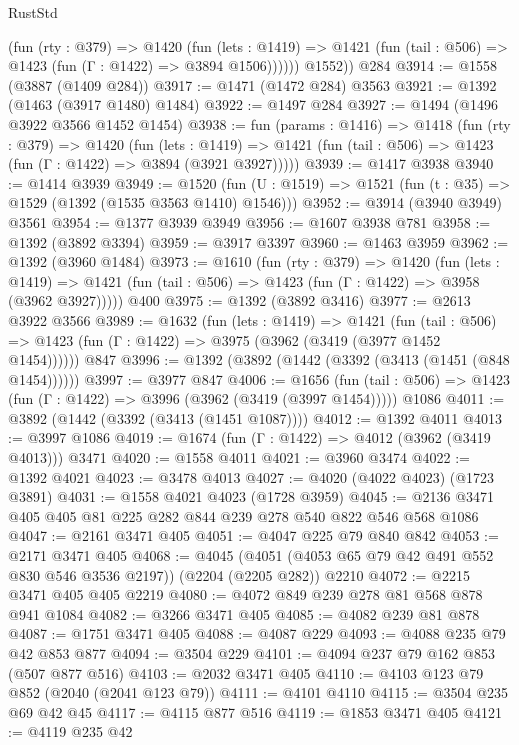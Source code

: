 \begin{lexlean}{RustStd}
\begin{coremodule}
            (fun (rty : @379) =>
            @1420
              (fun (lets : @1419) =>
              @1421 (fun (tail : @506) => @1423 (fun (Γ : @1422) => @3894 @1506))))))
        @1552))
    @284
@3914 := @1558 (@3887 (@1409 @284))
@3917 := @1471 (@1472 @284) @3563
@3921 := @1392 (@1463 (@3917 @1480) @1484)
@3922 := @1497 @284
@3927 := @1494 (@1496 @3922 @3566 @1452 @1454)
@3938 := fun (params : @1416) =>
  @1418
    (fun (rty : @379) =>
    @1420
      (fun (lets : @1419) =>
      @1421 (fun (tail : @506) => @1423 (fun (Γ : @1422) => @3894 (@3921 @3927)))))
@3939 := @1417 @3938
@3940 := @1414 @3939
@3949 := @1520 (fun (U : @1519) => @1521 (fun (t : @35) => @1529 (@1392 (@1535 @3563 @1410) @1546)))
@3952 := @3914 (@3940 @3949) @3561
@3954 := @1377 @3939 @3949
@3956 := @1607 @3938 @781
@3958 := @1392 (@3892 @3394)
@3959 := @3917 @3397
@3960 := @1463 @3959
@3962 := @1392 (@3960 @1484)
@3973 := @1610
    (fun (rty : @379) =>
    @1420
      (fun (lets : @1419) =>
      @1421 (fun (tail : @506) => @1423 (fun (Γ : @1422) => @3958 (@3962 @3927)))))
    @400
@3975 := @1392 (@3892 @3416)
@3977 := @2613 @3922 @3566
@3989 := @1632
    (fun (lets : @1419) =>
    @1421
      (fun (tail : @506) => @1423 (fun (Γ : @1422) => @3975 (@3962 (@3419 (@3977 @1452 @1454))))))
    @847
@3996 := @1392 (@3892 (@1442 (@3392 (@3413 (@1451 (@848 @1454))))))
@3997 := @3977 @847
@4006 := @1656
    (fun (tail : @506) => @1423 (fun (Γ : @1422) => @3996 (@3962 (@3419 (@3997 @1454)))))
    @1086
@4011 := @3892 (@1442 (@3392 (@3413 (@1451 @1087))))
@4012 := @1392 @4011
@4013 := @3997 @1086
@4019 := @1674 (fun (Γ : @1422) => @4012 (@3962 (@3419 @4013))) @3471
@4020 := @1558 @4011
@4021 := @3960 @3474
@4022 := @1392 @4021
@4023 := @3478 @4013
@4027 := @4020 (@4022 @4023) (@1723 @3891)
@4031 := @1558 @4021 @4023 (@1728 @3959)
@4045 := @2136 @3471 @405 @405 @81 @225 @282 @844 @239 @278 @540 @822 @546 @568 @1086
@4047 := @2161 @3471 @405
@4051 := @4047 @225 @79 @840 @842
@4053 := @2171 @3471 @405
@4068 := @4045
    (@4051 (@4053 @65 @79 @42 @491 @552 @830 @546 @3536 @2197))
    (@2204 (@2205 @282))
    @2210
@4072 := @2215 @3471 @405 @405 @2219
@4080 := @4072 @849 @239 @278 @81 @568 @878 @941 @1084
@4082 := @3266 @3471 @405
@4085 := @4082 @239 @81 @878
@4087 := @1751 @3471 @405
@4088 := @4087 @229
@4093 := @4088 @235 @79 @42 @853 @877
@4094 := @3504 @229
@4101 := @4094 @237 @79 @162 @853 (@507 @877 @516)
@4103 := @2032 @3471 @405
@4110 := @4103 @123 @79 @852 (@2040 (@2041 @123 @79))
@4111 := @4101 @4110
@4115 := @3504 @235 @69 @42 @45
@4117 := @4115 @877 @516
@4119 := @1853 @3471 @405
@4121 := @4119 @235 @42

\end{coremodule}
\end{lexlean}
